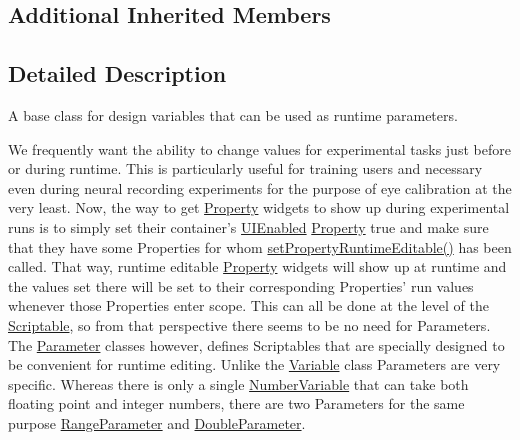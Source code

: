 \subsection*{Additional Inherited Members}


\subsection{Detailed Description}
A base class for design variables that can be used as runtime parameters. 

We frequently want the ability to change values for experimental tasks just before or during runtime. This is particularly useful for training users and necessary even during neural recording experiments for the purpose of eye calibration at the very least. Now, the way to get \hyperlink{class_picto_1_1_property}{Property} widgets to show up during experimental runs is to simply set their container's \hyperlink{class_picto_1_1_u_i_enabled}{U\-I\-Enabled} \hyperlink{class_picto_1_1_property}{Property} true and make sure that they have some Properties for whom \hyperlink{class_picto_1_1_scriptable_ab738ef884dc8cbd5d28fff4fde5cbca6}{set\-Property\-Runtime\-Editable()} has been called. That way, runtime editable \hyperlink{class_picto_1_1_property}{Property} widgets will show up at runtime and the values set there will be set to their corresponding Properties' run values whenever those Properties enter scope. This can all be done at the level of the \hyperlink{class_picto_1_1_scriptable}{Scriptable}, so from that perspective there seems to be no need for Parameters. The \hyperlink{class_picto_1_1_parameter}{Parameter} classes however, defines Scriptables that are specially designed to be convenient for runtime editing. Unlike the \hyperlink{class_picto_1_1_variable}{Variable} class Parameters are very specific. Whereas there is only a single \hyperlink{class_picto_1_1_number_variable}{Number\-Variable} that can take both floating point and integer numbers, there are two Parameters for the same purpose \hyperlink{class_picto_1_1_range_parameter}{Range\-Parameter} and \hyperlink{class_picto_1_1_double_parameter}{Double\-Parameter}.

